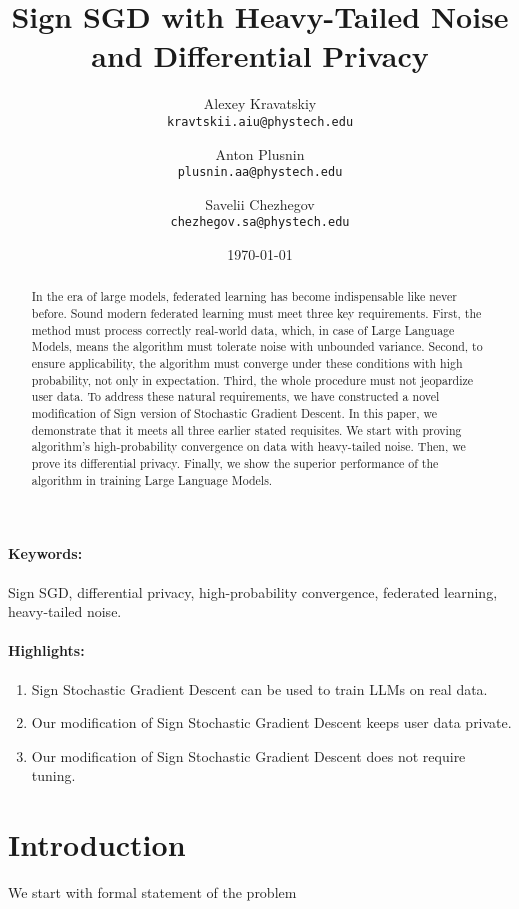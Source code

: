 \documentclass{article}
\title{Sign SGD with Heavy-Tailed Noise and Differential Privacy}
\author{
  Alexey Kravatskiy\\
  \texttt{kravtskii.aiu@phystech.edu}
  \and
  Anton Plusnin\\
  \texttt{plusnin.aa@phystech.edu}
  \and
  Savelii Chezhegov\\
  \texttt{chezhegov.sa@phystech.edu}
}
\date{\today}
\begin{document}
\maketitle

\begin{abstract}
In the era of large models, federated learning has become indispensable like never before. Sound modern federated learning must meet three key requirements. First, the method must process correctly real-world data, which, in case of Large Language Models, means the algorithm must tolerate noise with unbounded variance. Second, to ensure applicability, the algorithm must converge under these conditions with high probability, not only in expectation. Third, the whole procedure must not jeopardize user data. To address these natural requirements, we have constructed a novel modification of Sign version of Stochastic Gradient Descent. In this paper, we demonstrate that it meets all three earlier stated requisites. We start with proving algorithm's high-probability convergence on data with heavy-tailed noise. Then, we prove its differential privacy. Finally, we show the superior performance of the algorithm in training Large Language Models.

\end{abstract}

\paragraph{Keywords:} Sign SGD, differential privacy, high-probability convergence, federated learning, heavy-tailed noise.

\paragraph{Highlights:}
\begin{enumerate}
\item Sign Stochastic Gradient Descent can be used to train LLMs on real data.
\item Our modification of Sign Stochastic Gradient Descent keeps user data private.
\item Our modification of Sign Stochastic Gradient Descent does not require tuning.
\end{enumerate}

\section{Introduction}
We start with formal statement of the problem
\end{document}
